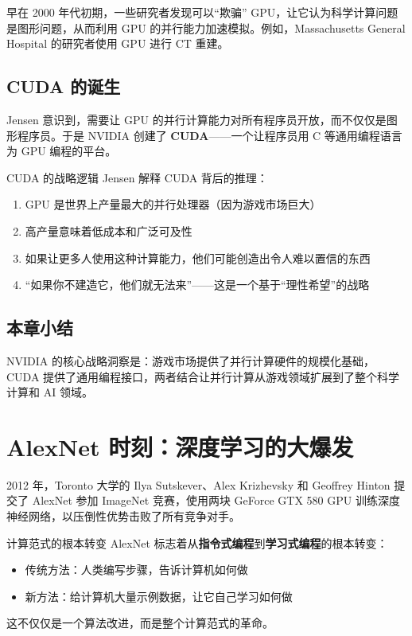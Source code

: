 \documentclass[a4paper]{article}
\begin{document}
早在 2000 年代初期，一些研究者发现可以``欺骗'' GPU，让它认为科学计算问题是图形问题，从而利用 GPU 的并行能力加速模拟。例如，Massachusetts General Hospital 的研究者使用 GPU 进行 CT 重建。

\subsection{CUDA 的诞生}

Jensen 意识到，需要让 GPU 的并行计算能力对所有程序员开放，而不仅仅是图形程序员。于是 NVIDIA 创建了 \textbf{CUDA}——一个让程序员用 C 等通用编程语言为 GPU 编程的平台。

\begin{importantbox}{CUDA 的战略逻辑}
Jensen 解释 CUDA 背后的推理：
\begin{enumerate}
    \item GPU 是世界上产量最大的并行处理器（因为游戏市场巨大）
    \item 高产量意味着低成本和广泛可及性
    \item 如果让更多人使用这种计算能力，他们可能创造出令人难以置信的东西
    \item ``如果你不建造它，他们就无法来''——这是一个基于``理性希望''的战略
\end{enumerate}
\end{importantbox}

\subsection{本章小结}
NVIDIA 的核心战略洞察是：游戏市场提供了并行计算硬件的规模化基础，CUDA 提供了通用编程接口，两者结合让并行计算从游戏领域扩展到了整个科学计算和 AI 领域。

\section{AlexNet 时刻：深度学习的大爆发}

2012 年，Toronto 大学的 Ilya Sutskever、Alex Krizhevsky 和 Geoffrey Hinton 提交了 AlexNet 参加 ImageNet 竞赛，使用两块 GeForce GTX 580 GPU 训练深度神经网络，以压倒性优势击败了所有竞争对手。

\begin{importantbox}{计算范式的根本转变}
AlexNet 标志着从\textbf{指令式编程}到\textbf{学习式编程}的根本转变：
\begin{itemize}
    \item 传统方法：人类编写步骤，告诉计算机如何做
    \item 新方法：给计算机大量示例数据，让它自己学习如何做
\end{itemize}
这不仅仅是一个算法改进，而是整个计算范式的革命。
\end{importantbox}
\end{document}
